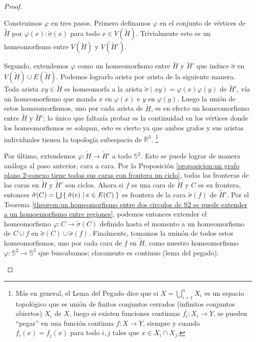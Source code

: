 \documentclass[12pt]{report}
\theoremstyle{plain}
\theoremstyle{definition}
\newcommand{\reals}{\mathbb{R}}
\begin{document}
\begin{proof}
\begin{enumerate}
Construimos $\varphi$ en tres pasos. Primero definamos $\varphi$ en el conjunto de vértices de $\tilde H$ por $\varphi (x): \tilde \sigma (x)$ para todo $x \in V(\tilde H)$. Trivialmente esto es un homeomorfismo entre $V(\tilde H)$ y $V (\tilde H ')$.

Segundo, extendemos $\varphi$ como un homeomorfismo entre $\tilde H$ y $\tilde H '$ que induce $\tilde \sigma$ en $V(\tilde H) \cup E(\tilde H)$. Podemos lograrlo arista por arista de la siguiente manera. Toda arista $xy \in \tilde H$ es homeomorfa a la arista $\tilde \sigma (xy) = \varphi (x) \varphi (y)$ de $\tilde H'$, vía un homeomorfismo que manda $x$ en $\varphi (x)$ e $y$ en $\varphi (y)$. Luego la unión de estos homeomorfismos, uno por cada arista de $\tilde H$, es en efecto un homeomorfismo entre $\tilde H$ y $\tilde H '$; lo único que faltaría probar es la continuidad en los vértices donde los homeomorfismos se solapan, esto es cierto ya que ambos grafos y sus aristas individuales tienen la topología subespacio de $\reals^3$. \footnote{
Más en general, el Lema del Pegado dice que si $X = \bigcup_{i = 1}^n X_i$ es un espacio topológico que es unión de finitos conjuntos cerrados (infinitos conjuntos abiertos) $X_i$ de $X$, luego si existen funciones continuas $f_i : X_i \rightarrow Y$, se pueden ``pegar'' en una función continua $f : X \rightarrow Y$, siempre y cuando $f_i(x) = f_j(x)$ para todo $i,j$ tales que $x \in X_i \cap X_j$.
}

Por último, extendemos $\varphi : \tilde H \rightarrow \tilde H '$ a todo $\mathbb{S}^2$. Esto se puede lograr de manera análoga al paso anterior, cara a cara. Por la Proposición \ref{proposicion:un grafo plano 2-conexo tiene todas sus caras con frontera un ciclo}, todas las fronteras de las caras en $\tilde H$ y $\tilde H '$ son ciclos. Ahora si $f$ es una cara de $\tilde H$ y $C$ es su frontera, entonces $\tilde \sigma (C) = \bigcup \Set{ \tilde \sigma (e) | e \in E ( C)}$ es frontera de la cara $\tilde \sigma (f)$ de $\tilde H '$. Por el Teorema \ref{theorem:un homeomorfismo entre dos circulos de S2 se puede extender a un homoemorfismo entre regiones}, podemos entonces extender el homeomorfismo $\varphi : C \rightarrow \tilde \sigma (C)$ definido hasta el momento a un homeomorfismo de $C \cup f$ en $\tilde \sigma (C) \cup \tilde \sigma (f)$. Finalmente, tomamos la uninón de todos estos homeomorfismos, uno por cada cara de $f$ en $\tilde H$, como nuestro homeomorfismo $\varphi : \mathbb{S}^2 \rightarrow \mathbb{S}^2$ que buscabamos; claramente es continuo (lema del pegado).
\end{enumerate}
\end{proof}
\end{document}
